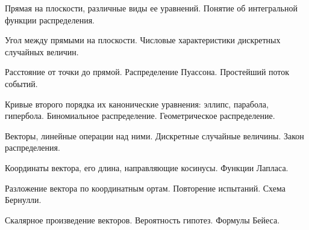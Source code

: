 \documentclass[
	14pt,
	a4paper,
	]
	{scrartcl}
\begin{document}
\vfill
\z 	Прямая на плоскости, различные виды ее уравнений.
 \vfill
\z 	Понятие об интегральной  функции распределения. 
 \vfill

\vfill

\newpage


\shapk
{}
\setcounter{zad}{0}

\vfill
\z 	Угол между прямыми на плоскости.
 \vfill
\z 	Числовые характеристики дискретных случайных величин.
 \vfill

\vfill

\newpage


\shapk
{}
\setcounter{zad}{0}

\vfill
\z 	Расстояние от точки до прямой.
 \vfill
\z 	Распределение Пуассона. Простейший поток событий.
 \vfill

\vfill

\newpage


\shapk
{}
\setcounter{zad}{0}

\vfill
\z 	Кривые второго порядка их канонические уравнения: эллипс, парабола, гипербола.
 \vfill
\z 	Биномиальное распределение. Геометрическое распределение.
 \vfill

\vfill

\newpage


\shapk
{}
\setcounter{zad}{0}

\vfill
\z 	Векторы, линейные операции над ними.
 \vfill
\z 	Дискретные случайные величины. Закон распределения. 
 \vfill

\vfill

\newpage


\shapk
{}
\setcounter{zad}{0}

\vfill
\z 	Координаты вектора, его длина, направляющие косинусы.
 \vfill
\z 	Функции Лапласа.
 \vfill

\vfill

\newpage


\shapk
{}
\setcounter{zad}{0}

\vfill
\z 	Разложение вектора по координатным ортам.
 \vfill
\z 	Повторение испытаний. Схема Бернулли. 
 \vfill

\vfill

\newpage


\shapk
{}
\setcounter{zad}{0}

\vfill
\z 	Скалярное произведение векторов.
 \vfill
\z 	Вероятность гипотез. Формулы Бейеса.
 \vfill
\end{document}
